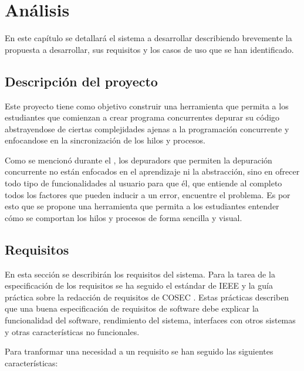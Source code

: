\chapter{Análisis}\label{chap:analisis}
En este capítulo se detallará el sistema a desarrollar describiendo brevemente la propuesta a desarrollar, sus requisitos y los casos de uso que se han identificado.

\section{Descripción del proyecto}\label{sec:descripcion}
Este proyecto tiene como objetivo construir una herramienta que permita a los estudiantes que comienzan a crear \glspl{programa concurrente} depurar su código abstrayendose de ciertas complejidades ajenas a la programación concurrente y enfocandose en la sincronización de los \glspl{hilo} y \glspl{proceso}.

Como se mencionó durante el , los \glspl{depurador} que permiten la depuración concurrente no están enfocados en el aprendizaje ni la abstracción, sino en ofrecer todo tipo de funcionalidades al usuario para que él, que entiende al completo todos los factores que pueden inducir a un error, encuentre el problema. Es por esto que se propone una herramienta que permita a los estudiantes entender cómo se comportan los \glspl{hilo} y \glspl{proceso} de forma sencilla y visual.

\section{Requisitos}\label{sec:requisitos}

En esta sección se describirán los requisitos del sistema. Para la tarea de la especificación de los requisitos se ha seguido el estándar de IEEE \cite{IEEE-Requirements} y la guía práctica sobre la redacción de requisitos de COSEC \cite{INCOSE-Requirements}. Estas prácticas describen que una buena especificación de requisitos de \gls{software} debe explicar la funcionalidad del \gls{software}, rendimiento del sistema, interfaces con otros sistemas y otras características no funcionales.

Para tranformar una necesidad a un requisito se han seguido las siguientes características:


